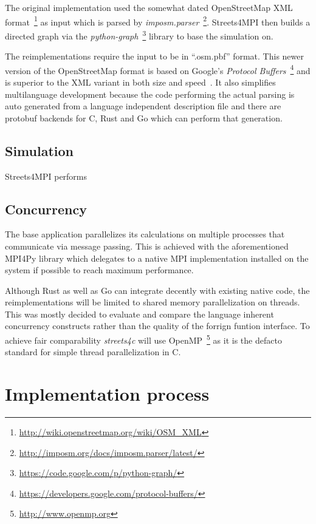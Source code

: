 The original implementation used the somewhat dated OpenStreetMap XML format~\footnote{\url{http://wiki.openstreetmap.org/wiki/OSM_XML}} as input which is parsed by \textit{imposm.parser}~\footnote{\url{http://imposm.org/docs/imposm.parser/latest/}}. Streets4MPI then builds a directed graph via the \textit{python-graph}~\footnote{\url{https://code.google.com/p/python-graph/}} library to base the simulation on.\cite{streets_report}

The reimplementations require the input to be in ``.osm.pbf'' format. This newer version of the OpenStreetMap format is based on Google's \textit{Protocol Buffers}~\footnote{\url{https://developers.google.com/protocol-buffers/}} and is superior to the XML variant in both size and speed~\cite{osm_wiki_pbf}. It also simplifies multilanguage development because the code performing the actual parsing is auto generated from a language independent description file and there are protobuf backends for C, Rust and Go which can perform that generation.

\subsection*{Simulation}
\label{subsec:Approach::Differences::Simulation}

Streets4MPI performs

\subsection*{Concurrency}
\label{subsec:Approach::Differences::Concurrency}

The base application parallelizes its calculations on multiple processes that communicate via message passing. This is achieved with the aforementioned MPI4Py library which delegates to a native MPI implementation installed on the system if possible to reach maximum performance.

Although Rust as well as Go can integrate decently with existing native code, the reimplementations will be limited to shared memory parallelization on threads. This was mostly decided to evaluate and compare the language inherent concurrency constructs rather than the quality of the forrign funtion interface. To achieve fair comparability \textit{streets4c} will use OpenMP~\footnote{\url{http://www.openmp.org}} as it is the defacto standard for simple thread parallelization in C.

\section{Implementation process}
\label{sec:Approach::Implementation}
